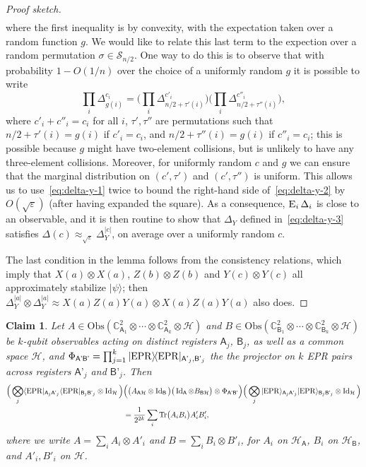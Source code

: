 \documentclass[11pt]{article}
\newtheorem{claim}[theorem]{Claim}
\theoremstyle{remark}
\theoremstyle{definition}
\newcommand{\ket}[1]{|#1\rangle}
\newcommand{\bra}[1]{\langle#1|}
\newcommand{\proj}[1]{\ket{#1}\!\bra{#1}}
\newcommand{\Tr}{\mbox{\rm Tr}}
\newcommand{\Id}{\ensuremath{\mathop{\rm Id}\nolimits}}
\newcommand{\Es}[1]{\ensuremath{\mathop{\textsc{E}}_{#1}}}
\newcommand{\reg}[1]{{\textsf{#1}}}
\newcommand{\C}{\ensuremath{\mathbb{C}}}
\newcommand{\mH}{\mathcal{H}}
\newcommand{\setft}[1]{\mathrm{#1}}
\newcommand{\Obs}{\setft{Obs}}
\newcommand{\eps}{\varepsilon}
\newcommand{\EPR}{{\rm EPR}}
\begin{document}
\begin{proof}[Proof sketch]
\begin{align}
\end{align}
where the first inequality is by convexity, with the expectation taken over a random function $g$. We would like to relate this last term to the expection over a random permutation $\sigma\in\mathcal{S}_{n/2}$. One way to do this is to observe that with  probability $1-O(1/n)$ over the choice of a uniformly random $g$ it is possible to write
$$ \prod_i \Delta_{g(i)}^{c_i} = \Big(\prod_i \Delta_{n/2+\tau'(i)}^{c'_i}\Big)\Big(\prod_i \Delta_{n/2+\tau''(i)}^{c''_i}\Big),$$
where $c'_i+c''_i=c_i$ for all $i$, $\tau',\tau''$ are permutations such that $n/2+\tau'(i)=g(i)$ if $c'_i=c_i$, and $n/2+\tau''(i)=g(i)$ if $c''_i=c_i$; this is possible because $g$ might have two-element collisions, but is unlikely to have any three-element collisions. Moreover, for uniformly random $c$ and $g$ we can ensure that the marginal distribution on $(c',\tau')$ and $(c',\tau'')$ is uniform.  This allows us to use~\eqref{eq:delta-y-1} twice to bound the right-hand side of~\eqref{eq:delta-y-2} by $O(\sqrt{\eps})$ (after having expanded the square). As a consequence, $\Es{i}\Delta_i$ is close to an observable, and it is then routine to show that $\Delta_Y$ defined in~\eqref{eq:delta-y-3} satisfies $\Delta(c) \approx_{\sqrt{\eps}} \Delta_Y^{|c|}$, on average over a uniformly random $c$. 

The last condition in the lemma follows from the consistency relations, which imply that $X(a)\otimes X(a)$, $Z(b)\otimes Z(b)$ and $Y(c)\otimes Y(c)$ all approximately stabilize $\ket{\psi}$; then $\Delta_Y^{|a|} \otimes \Delta_Y^{|a|} \approx  X(a)Z(a)Y(a) \otimes X(a)Z(a)Y(a)$ also does. 
\end{proof}

\begin{claim}\label{claim:swap-tt}
Let $A\in \Obs(\C^2_{\reg{A}_1}\otimes \cdots\otimes \C^2_{\reg{A}_k} \otimes \mH)$ and $B\in \Obs(\C^2_{\reg{B}_1}\otimes \cdots\otimes \C^2_{\reg{B}_k}\otimes \mH)$ be $k$-qubit observables acting on distinct registers $\reg{A}_j$, $\reg{B}_j$, as well as a common space $\mH$, and $\Phi_{\reg{A'B'}} = \prod_{j=1}^k \proj{\EPR}_{\reg{A'}_j,\reg{B'}_j}$ the the projector on $k$ EPR pairs across registers $\reg{A'}_j$ and $\reg{B'}_j$.  Then 
\begin{align}
 \Big(\bigotimes_j \bra{\EPR}_{\reg{A}_j\reg{A'}_j}\bra{\EPR}_{\reg{B}_j\reg{B'}_j} \otimes \Id_{\mH} \Big)&\Big(\big(A_{\reg{A}\mH} \otimes \Id_\reg{B}\big)\big( \Id_\reg{A}\otimes B _{\reg{B}\mH}\big)\otimes \Phi_{\reg{A'B'}}\Big) \Big(\bigotimes_j \ket{\EPR}_{\reg{A}_j\reg{A'}_j}\ket{\EPR}_{\reg{B}_j\reg{B'}_j} \otimes \Id_\mH\Big)\notag\\
& = \frac{1}{2^{2k}}\sum_i \Tr\big(A_i B_i\big) A'_iB'_i,\label{eq:swap}
\end{align}
where we write $A = \sum_i A_i \otimes A'_i$ and $B=\sum_i B_i\otimes B'_i$, for $A_i$ on $\mH_\reg{A}$, $B_i$ on $\mH_{\reg{B}}$, and $A'_i,B'_i$ on $\mH$.
\end{claim}
\end{document}
